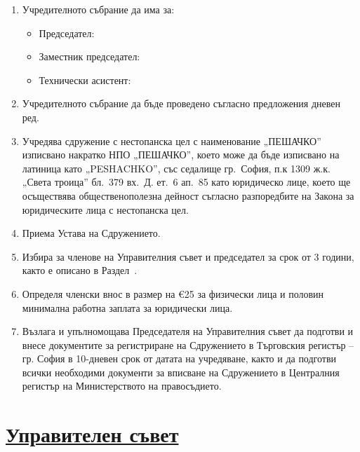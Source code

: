\documentclass[11pt,a4paper]{article}
\newlength{\itemvspace}
\begin{document}
\begin{enumerate}
\item Учредителното събрание да има за: \\[0.1cm]
  \begin{itemize}
  \item Председател: \dotfill \\[\itemvspace]
  \item Заместник председател: \dotfill \\[\itemvspace]
  \item Технически асистент: \dotfill
  \end{itemize}
\item Учредителното събрание да бъде проведено съгласно предложения дневен ред.
\item Учредява сдружение с нестопанска цел с наименование „ПЕШАЧКО” изписвано накратко
  НПО „ПЕШАЧКО”, което може да бъде изписвано на латиница като „PESHACHKO”, със седалище
  гр.~София, п.к 1309 ж.к. „Света троица” бл.~379 вх.~Д. ет.~6 ап.~85 като юридическо
  лице, което ще осъществява общественополезна дейност съгласно разпоредбите на Закона
  за юридическите лица с нестопанска цел.
\item Приема Устава на Сдружението.
\item Избира за членове на Управителния съвет и председател за срок от 3 години, както
  е описано в Раздел~.
\item Определя членски внос в размер на €25 за физически лица и половин минимална
  работна заплата за юридически лица.
\item Възлага и упълномощава Председателя на Управителния съвет да подготви и внесе
  документите за регистриране на Сдружението в Търговския регистър – гр. София в
  10-дневен срок от датата на учредяване, както и да подготви всички необходими
  документи за вписване на Сдружението в Централния регистър на Министерството на
  правосъдието.
\end{enumerate}

\vspace{1cm}

\section*{\uline{Управителен съвет}}\label{sec:management-board}

\vspace{0.7cm}
\end{document}
